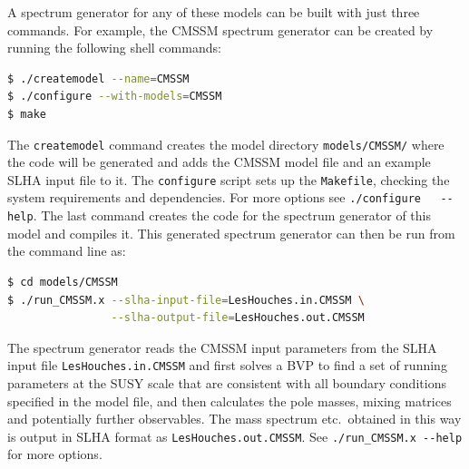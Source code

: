 \documentclass[final,3p,11pt,pdflatex]{elsarticle}
\newcommand{\code}[1]{\lstinline|#1|}  %
\begin{document}
A spectrum generator for any of these models can be built with just
three commands.  For example, the CMSSM spectrum generator can be
created by running the following shell commands:
%
\begin{lstlisting}[language=bash]
$ ./createmodel --name=CMSSM
$ ./configure --with-models=CMSSM
$ make
\end{lstlisting}%
%
The \code{createmodel} command creates the model directory
\code{models/CMSSM/} where the code will be generated and adds the
CMSSM model file and an example SLHA input file to it.  The \code{configure}
script sets up the \code{Makefile}, checking the system requirements
and dependencies.  For more options see \code{./configure
  --help}.  The last command creates the code for the spectrum
generator of this model and compiles it.
%
This generated spectrum generator can then be run from the command
line as:
%
\begin{lstlisting}[language=bash]
$ cd models/CMSSM
$ ./run_CMSSM.x --slha-input-file=LesHouches.in.CMSSM \
                --slha-output-file=LesHouches.out.CMSSM
\end{lstlisting}
%
The spectrum generator reads the CMSSM input parameters from the SLHA input file
\code{LesHouches.in.CMSSM} and first solves a BVP to find a
set of running parameters at the SUSY scale that are consistent with all
boundary conditions specified in the model file, and then calculates the pole
masses, mixing matrices and potentially further observables.
The mass spectrum etc.\ obtained in this way is output
in SLHA format \cite{Skands:2003cj,Allanach:2008qq} as
\code{LesHouches.out.CMSSM}.  See \code{./run_CMSSM.x --help} for more
options.
\end{document}
